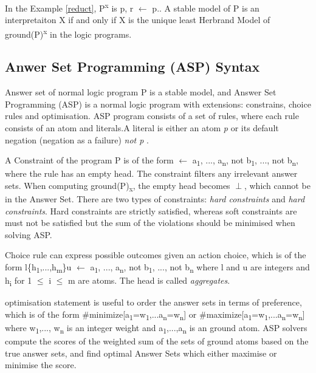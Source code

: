 \documentclass[12pt,twoside]{report}
\begin{document}
In the Example \ref{reduct}, P\textsuperscript{x} is {p, r $\leftarrow$ p.}.
A stable model of P is an interpretaiton X if and only if X is the unique least Herbrand Model of ground(P)\textsuperscript{x} in the logic programs.

\subsection{Anwer Set Programming (ASP) Syntax}

Answer set of normal logic program P is a stable model, and Answer Set Programming (ASP) is a normal logic program with extensions: constrains, choice rules and optimisation. ASP program consists of a set of rules, where each rule consists of an atom and literals.A literal is either an atom \textit{p} or its default negation (negation as a failure) \textit{not p} .

A Constraint of the program P is of the form $\leftarrow$ a\textsubscript{1}, ..., a\textsubscript{n}, not b\textsubscript{1}, ..., not b\textsubscript{n}, where the rule has an empty head. The constraint filters any irrelevant answer sets. When computing ground(P)\textsubscript{x}, the empty head becomes $\perp$, which cannot be in the Answer Set.
There are two types of constraints: \textit{hard constraints} and \textit{hard constraints}. Hard constraints are strictly satisfied, whereas soft constraints are must not be satisfied but the sum of the violations should be minimised when solving ASP.

Choice rule can express possible outcomes given an action choice, which is of the form
l\{h\textsubscript{1},...,h\textsubscript{m}\}u $\leftarrow$ a\textsubscript{1}, ..., a\textsubscript{n}, not b\textsubscript{1}, ..., not b\textsubscript{n} where  l and u are integers and h\textsubscript{i} for 1 $\leq$ i $\leq$ m are atoms. The head is called \textit{aggregates}.

optimisation statement is useful to order the answer sets in terms of preference, which is of the form
\#minimize[a\textsubscript{1}=w\textsubscript{1},...a\textsubscript{n}=w\textsubscript{n}] or \#maximize[a\textsubscript{1}=w\textsubscript{1},...a\textsubscript{n}=w\textsubscript{n}] where w\textsubscript{1},..., w\textsubscript{n} is an integer weight and a\textsubscript{1},...,a\textsubscript{n} is an ground atom.  ASP solvers compute the scores of the weighted sum of the sets of ground atoms based on the true answer sets, and find optimal Answer Sets which either maximise or minimise the score.
\end{document}
